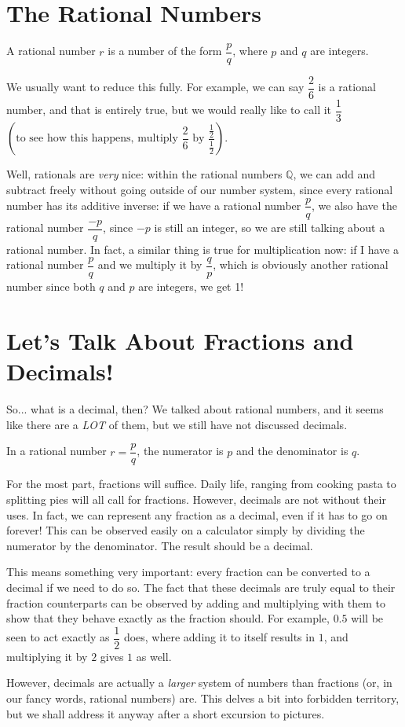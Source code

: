 \documentclass[openany]{book}
\begin{document}
\section{The Rational Numbers}
\begin{definition}
	A rational number $r$ is a number of the form $\dfrac{p}{q}$, where $p$ and $q$ are integers.
\end{definition}
We usually want to reduce this fully. For example, we can say $\dfrac{2}{6}$ is a rational number, and that is entirely true, but we would really like to call it $\dfrac{1}{3}$ $\left(\text{to see how this happens, multiply }\dfrac{2}{6}\text{ by }\dfrac{\frac{1}{2}}{\frac{1}{2}}\right)$.\par
Well, rationals are \textit{very} nice: within the rational numbers $\mathbb{Q}$, we can add and subtract freely without going outside of our number system, since every rational number has its additive inverse: if we have a rational number $\dfrac{p}{q}$, we also have the rational number $\dfrac{-p}{q}$, since $-p$ is still an integer, so we are still talking about a rational number. In fact, a similar thing is true for multiplication now: if I have a rational number $\dfrac{p}{q}$ and we multiply it by $\dfrac{q}{p}$, which is obviously another rational number since both $q$ and $p$ are integers, we get 1!
\section{Let's Talk About Fractions and Decimals!}
So... what is a decimal, then? We talked about rational numbers, and it seems like there are a \textit{LOT} of them, but we still have not discussed decimals.\par
\begin{definition}
	In a rational number $r = \dfrac{p}{q}$, the numerator is $p$ and the denominator is $q$.
\end{definition}
For the most part, fractions will suffice. Daily life, ranging from cooking pasta to splitting pies will all call for fractions. However, decimals are not without their uses. In fact, we can represent any fraction as a decimal, even if it has to go on forever! This can be observed easily on a calculator simply by dividing the numerator by the denominator. The result should be a decimal.\par
This means something very important: every fraction can be converted to a decimal if we need to do so. The fact that these decimals are truly equal to their fraction counterparts can be observed by adding and multiplying with them to show that they behave exactly as the fraction should. For example, $0.5$ will be seen to act exactly as $\dfrac{1}{2}$ does, where adding it to itself results in $1$, and multiplying it by $2$ gives $1$ as well.\par
However, decimals are actually a \textit{larger} system of numbers than fractions (or, in our fancy words, rational numbers) are. This delves a bit into forbidden territory, but we shall address it anyway after a short excursion to pictures.
\end{document}
